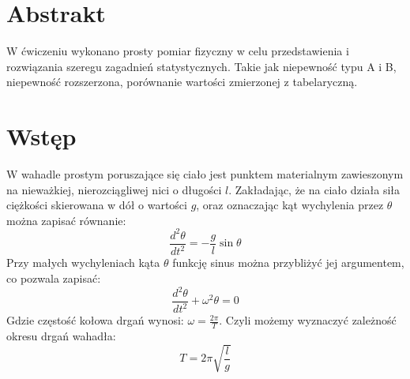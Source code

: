 \documentclass{article}
\begin{document}

\section{Abstrakt} 
	W ćwiczeniu wykonano prosty pomiar fizyczny w celu przedstawienia i rozwiązania szeregu zagadnień statystycznych. Takie jak niepewność typu A i B, niepewność rozszerzona, porównanie wartości zmierzonej z tabelaryczną. 
	

\section{Wstęp}
	W wahadle prostym poruszające się ciało jest punktem materialnym zawieszonym na nieważkiej, nierozciągliwej nici o długości $l$. Zakładając, że na ciało działa siła ciężkości skierowana w dół o wartości $g$, oraz oznaczając kąt wychylenia przez $\theta$ można zapisać równanie:
	\begin{equation}
		\frac{d^2\theta}{dt^2} = -\frac{g}{l}\sin{\theta}
		\label{wzor1}
	\end{equation}
	Przy małych wychyleniach kąta $\theta$ funkcję sinus można przybliżyć jej argumentem, co pozwala zapisać:
	\begin{equation}
		\frac{d^2\theta}{dt^2} +\omega^2\theta = 0
		\label{wzor2}
	\end{equation}
	Gdzie częstość kołowa drgań wynosi: $\omega = \frac{2\pi}{T}$. Czyli możemy wyznaczyć zależność okresu drgań wahadła:
	\begin{equation}
		T = 2\pi\sqrt{\frac{l}{g}}
		\label{wzor3}
	\end{equation}
	
\end{document}
